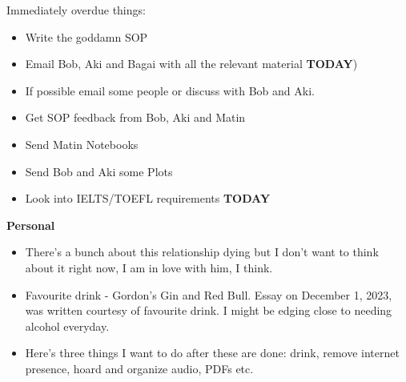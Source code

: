 \noindent {}
Immediately overdue things:
\begin{itemize}
    \item Write the goddamn SOP
    \item Email Bob, Aki and Bagai with all the relevant material \textbf{TODAY})
    \item If possible email some people or discuss with Bob and Aki. 
    \item Get SOP feedback from Bob, Aki and Matin
    \item Send Matin Notebooks
    \item Send Bob and Aki some Plots
    \item Look into IELTS/TOEFL requirements \textbf{TODAY}
\end{itemize}

\noindent \textbf{Personal}\\
\begin{itemize}
    \item There's a bunch about this relationship dying but I don't want to think about it right now, I am in love with him, I think.
    \item Favourite drink - Gordon's Gin and Red Bull. Essay on December 1, 2023, was written courtesy of favourite drink. I might be edging close to needing alcohol everyday.
    \item  Here's three things I want to do after these are done: drink, remove internet presence, hoard and organize audio, PDFs etc.
\end{itemize}